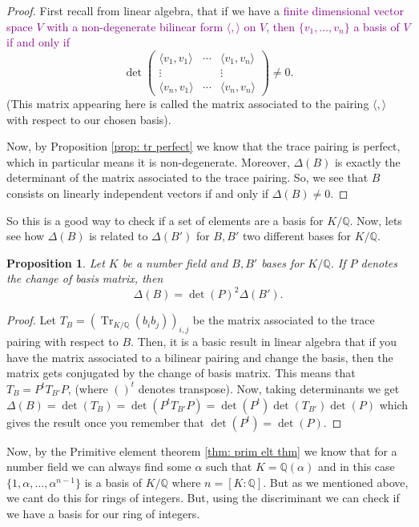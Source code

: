 \documentclass[11pt,a4paper]{report}
\theoremstyle{plain}
\newtheorem{prop}[subsection]{Proposition}
\theoremstyle{definition}
\theoremstyle{definition}
\newcommand{\Tr}{\operatorname{Tr}}
\def\QQ{\mathbb{Q}}
\def \a{\alpha}
\begin{document}
	\begin{proof}
		First recall from linear algebra, that if we have a \textcolor{purple}{finite dimensional vector space $V$ with a non-degenerate bilinear form $\langle, \rangle$ on \textcolor{purple}{$V$}, then $\{v_1,\dots,v_n\}$ a basis of $V$ if and only if} \[\det  \left (\begin{matrix} \langle v_1, v_1 \rangle  &\cdots& \langle v_1,v_n \rangle \\ \vdots & & \vdots \\  \langle v_n,v_1\rangle &\cdots& \langle v_n,v_n\rangle
		\end{matrix} \right ) \neq 0.\] (This matrix appearing here is called the matrix associated to the pairing $\langle,\rangle$ with respect to our chosen basis).
		
		Now, by Proposition \ref{prop: tr perfect} we know that the trace pairing is perfect, which in particular means it is non-degenerate. Moreover, $\Delta(B)$ is exactly the determinant of the matrix associated to the trace pairing. So, we see that  $B$ consists on linearly independent vectors if and only if $\Delta(B) \neq 0$.
	\end{proof}
	So this is a good way to check if a set of elements are a basis for $K/\QQ$. Now, lets see how $\Delta(B)$ is related to $\Delta(B')$ for $B,B'$ two different bases for $K/\QQ$.
	
	\begin{prop}\label{prop: disc change of basis}
		Let $K$ be a number field and $B,B'$ bases for $K/\QQ$. If $P$ denotes the change of basis matrix, then \[\Delta(B)=\det(P)^2 \Delta(B').\]
	\end{prop}
	
	\begin{proof}
		Let $T_B=(\Tr_{K/\QQ}(b_i b_j))_{i,j}$ be the matrix associated to the trace pairing with respect to $B$. Then, it is a basic result in linear algebra that if you have the matrix associated to a bilinear pairing and change the basis, then the matrix gets conjugated by the change of basis matrix. This means that $T_B=P^{t}T_{B'}P$, (where $()^t$ denotes transpose). Now, taking determinants we get $\Delta(B)=\det(T_B)=\det(P^t T_{B'}P)=\det(P^t)\det(T_{B'})\det(P)$ which gives the result once you remember that $\det(P^t)=\det(P)$. 
	\end{proof}
	
	
	Now, by the Primitive element theorem \ref{thm: prim elt thm} we know that for a number field we can always find some $\a$ such that $K=\QQ(\a)$ and in this case $\{1,\a,\dots,\a^{n-1}\}$ is a basis of $K/\QQ$ where $n=[K:\QQ]$. But as we mentioned above, we cant do this for rings of integers. But, using the discriminant we can check if we have a basis for our ring of integers.
	
\end{document}
